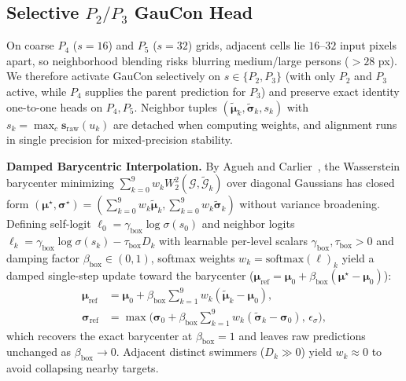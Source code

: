 \documentclass[10pt,twocolumn,letterpaper]{article}
\begin{document}
\subsection{Selective \texorpdfstring{$P_2/P_3$}{P2/P3} GauCon Head}
\label{sec:method_head}

On coarse $P_4$ ($s{=}16$) and $P_5$ ($s{=}32$) grids, adjacent cells lie $16\text{--}32$ input pixels apart, so neighborhood blending risks blurring medium/large persons ($>28$ px). We therefore activate GauCon selectively on $s \in \{P_2, P_3\}$ (with only $P_2$ and $P_3$ active, while $P_4$ supplies the parent prediction for $P_3$) and preserve exact identity one-to-one heads on $P_4, P_5$. Neighbor tuples $(\tilde{\boldsymbol{\mu}}_k, \tilde{\boldsymbol{\sigma}}_k, s_k)$ with $s_k = \max_c \mathbf{s}_{\mathrm{raw}}(u_k)$ are detached when computing weights, and alignment runs in single precision for mixed-precision stability.

\textbf{Damped Barycentric Interpolation.} By Agueh and Carlier~\cite{agueh2011barycenters}, the Wasserstein barycenter minimizing $\sum_{k=0}^9 w_k W_2^2(\mathcal{G}, \tilde{\mathcal{G}}_k)$ over diagonal Gaussians has closed form $(\boldsymbol{\mu}^\star, \boldsymbol{\sigma}^\star) = (\sum_{k=0}^9 w_k \tilde{\boldsymbol{\mu}}_k, \sum_{k=0}^9 w_k \tilde{\boldsymbol{\sigma}}_k)$ without variance broadening. Defining self-logit $\ell_0 = \gamma_{\mathrm{box}} \log\sigma(s_0)$ and neighbor logits $\ell_k = \gamma_{\mathrm{box}} \log\sigma(s_k) - \tau_{\mathrm{box}} D_k$ with learnable per-level scalars $\gamma_{\mathrm{box}}, \tau_{\mathrm{box}} > 0$ and damping factor $\beta_{\mathrm{box}} \in (0, 1)$, softmax weights $w_k = \mathrm{softmax}(\boldsymbol{\ell})_k$ yield a damped single-step update toward the barycenter ($\boldsymbol{\mu}_{\mathrm{ref}} = \boldsymbol{\mu}_0 + \beta_{\mathrm{box}}(\boldsymbol{\mu}^\star - \boldsymbol{\mu}_0)$):
\begin{align}
  \boldsymbol{\mu}_{\mathrm{ref}} &= \boldsymbol{\mu}_0 + \beta_{\mathrm{box}} \sum_{k=1}^{9} w_k (\tilde{\boldsymbol{\mu}}_k - \boldsymbol{\mu}_0), \nonumber\\
  \boldsymbol{\sigma}_{\mathrm{ref}} &= \max\!\Big(\boldsymbol{\sigma}_0 + \beta_{\mathrm{box}} \sum_{k=1}^{9} w_k (\tilde{\boldsymbol{\sigma}}_k - \boldsymbol{\sigma}_0),\, \epsilon_\sigma\Big),
  \label{eq:barycenter}
\end{align}
which recovers the exact barycenter at $\beta_{\mathrm{box}} = 1$ and leaves raw predictions unchanged as $\beta_{\mathrm{box}} \to 0$. Adjacent distinct swimmers ($D_k \gg 0$) yield $w_k \approx 0$ to avoid collapsing nearby targets.
\end{document}

